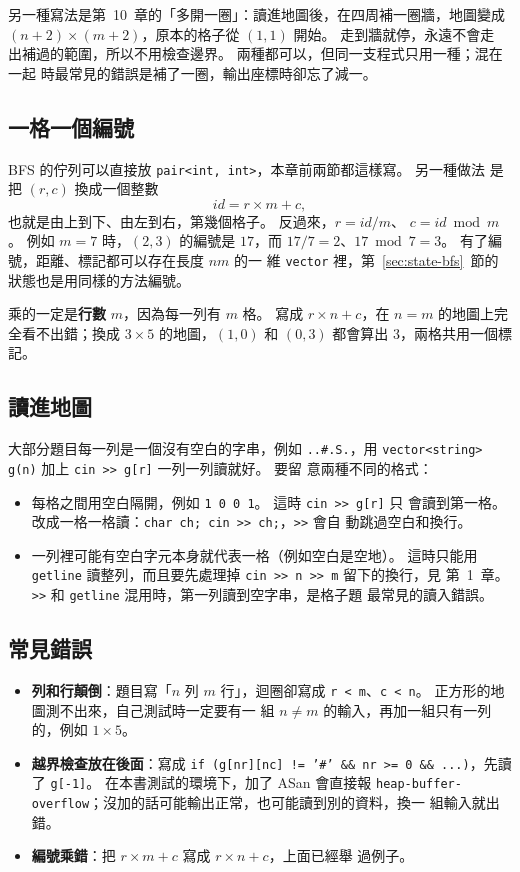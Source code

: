 另一種寫法是第~10~章的「多開一圈」：讀進地圖後，在四周補一圈牆，地圖變成
$(n + 2) \times (m + 2)$，原本的格子從 $(1, 1)$ 開始。 走到牆就停，永遠不會走
出補過的範圍，所以不用檢查邊界。 兩種都可以，但同一支程式只用一種；混在一起
時最常見的錯誤是補了一圈，輸出座標時卻忘了減一。

\subsection{一格一個編號}

BFS 的佇列可以直接放 \texttt{pair<int, int>}，本章前兩節都這樣寫。 另一種做法
是把 $(r, c)$ 換成一個整數
\[
\mathit{id} = r \times m + c,
\]
也就是由上到下、由左到右，第幾個格子。 反過來，$r = \mathit{id} / m$、
$c = \mathit{id} \bmod m$。 例如 $m = 7$ 時，$(2, 3)$ 的編號是 $17$，而
$17 / 7 = 2$、$17 \bmod 7 = 3$。 有了編號，距離、標記都可以存在長度 $nm$ 的一
維 \texttt{vector} 裡，第~\ref{sec:state-bfs}~節的狀態也是用同樣的方法編號。

乘的一定是\textbf{行數} $m$，因為每一列有 $m$ 格。 寫成 $r \times n + c$，在
$n = m$ 的地圖上完全看不出錯；換成 $3 \times 5$ 的地圖，$(1, 0)$ 和 $(0, 3)$
都會算出 $3$，兩格共用一個標記。

\subsection{讀進地圖}

大部分題目每一列是一個沒有空白的字串，例如 \texttt{..\#.S.}，用
\texttt{vector<string> g(n)} 加上 \texttt{cin >> g[r]} 一列一列讀就好。 要留
意兩種不同的格式：

\begin{itemize}
\item 每格之間用空白隔開，例如 \texttt{1 0 0 1}。 這時 \texttt{cin >> g[r]} 只
會讀到第一格。 改成一格一格讀：\texttt{char ch; cin >> ch;}，\texttt{>>} 會自
動跳過空白和換行。
\item 一列裡可能有空白字元本身就代表一格（例如空白是空地）。 這時只能用
\texttt{getline} 讀整列，而且要先處理掉 \texttt{cin >> n >> m} 留下的換行，見
第~1~章。 \texttt{>>} 和 \texttt{getline} 混用時，第一列讀到空字串，是格子題
最常見的讀入錯誤。
\end{itemize}

\subsection{常見錯誤}

\begin{itemize}
\item \textbf{列和行顛倒}：題目寫「$n$ 列 $m$ 行」，迴圈卻寫成
\texttt{r < m}、\texttt{c < n}。 正方形的地圖測不出來，自己測試時一定要有一
組 $n \ne m$ 的輸入，再加一組只有一列的，例如 $1 \times 5$。
\item \textbf{越界檢查放在後面}：寫成
\texttt{if (g[nr][nc] != '\#' \&\& nr >= 0 \&\& ...)}，先讀了
\texttt{g[-1]}。 在本書測試的環境下，加了 ASan 會直接報
\texttt{heap-buffer-overflow}；沒加的話可能輸出正常，也可能讀到別的資料，換一
組輸入就出錯。
\item \textbf{編號乘錯}：把 $r \times m + c$ 寫成 $r \times n + c$，上面已經舉
過例子。
\end{itemize}

